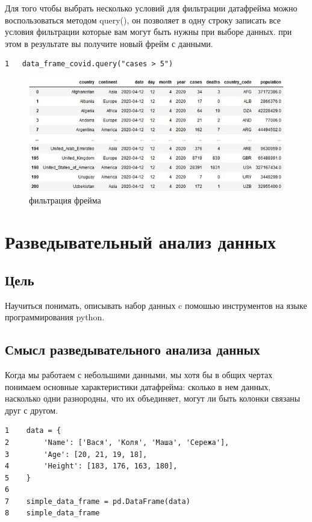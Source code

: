 \documentclass[12pt, a4paper]{article}
\begin{document}
{Для того чтобы выбрать несколько условий для фильтрации 
датафрейма можно воспользоваться методом query(), он 
позволяет в одну строку записать все условия фильтрации 
которые вам могут быть нужны при выборе данных. при этом 
в результате вы получите новый фрейм с данными.
\begin{verbatim}
1   data_frame_covid.query("cases > 5")
\end{verbatim}

\begin{figure}[h]
    \begin{center}
        \includegraphics[scale=0.5,keepaspectratio]
        {Pictures/Picture_2.jpg}
        \caption{фильтрация фрейма}
        \label{Picture_2}
    \end{center}
\end{figure}

\section{Разведывательный анализ данных}

\subsection{Цель}

Научиться понимать, описывать набор данных c помошью 
инструментов на языке программирования python.

\subsection{Смысл разведывательного анализа данных}

Когда мы работаем с небольшими данными, мы хотя бы в 
общих чертах понимаем основные характеристики датафрейма: 
сколько в нем данных, насколько одни разнородны, что их 
объединяет, могут ли быть колонки связаны друг с другом.

\begin{verbatim}
1    data = {
2        'Name': ['Вася', 'Коля', 'Маша', 'Сережа'], 
3        'Age': [20, 21, 19, 18],
4        'Height': [183, 176, 163, 180],
5    } 
6    
7    simple_data_frame = pd.DataFrame(data) 
8    simple_data_frame
\end{verbatim}

}
\end{document}
